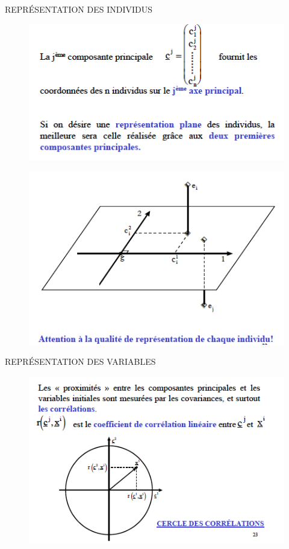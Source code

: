 \documentclass[11pt]{beamer}
\begin{document}
\begin{frame}{REPRÉSENTATION DES INDIVIDUS}

\begin{figure}
\includegraphics[scale=0.6]{schema15.png} 
\end{figure}

\end{frame}

\begin{frame}

\begin{figure}
\includegraphics[scale=0.6]{schema16.png} 
\end{figure}

\end{frame}


\begin{frame}{REPRÉSENTATION DES VARIABLES}

\begin{figure}
\includegraphics[scale=0.6]{schema17.png} 
\end{figure}

\end{frame}
\end{document}

